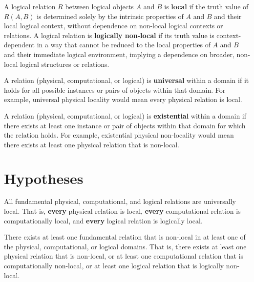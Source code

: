 \begin{definition}
	A logical relation $R$ between logical objects $A$ and $B$ is \textbf{local} if the truth value of $R(A, B)$ is determined solely by the intrinsic properties of $A$ and $B$ and their local logical context, without dependence on non-local logical contexts or relations. A logical relation is \textbf{logically non-local} if its truth value is context-dependent in a way that cannot be reduced to the local properties of $A$ and $B$ and their immediate logical environment, implying a dependence on broader, non-local logical structures or relations.
\end{definition}

\begin{definition}
	A relation (physical, computational, or logical) is \textbf{universal} within a domain if it holds for all possible instances or pairs of objects within that domain. For example, universal physical locality would mean every physical relation is local.
\end{definition}

\begin{definition}
	A relation (physical, computational, or logical) is \textbf{existential} within a domain if there exists at least one instance or pair of objects within that domain for which the relation holds. For example, existential physical non-locality would mean there exists at least one physical relation that is non-local.
\end{definition}

\section{Hypotheses}

\begin{hypothesis}
	All fundamental physical, computational, and logical relations are universally local. That is, \textbf{every} physical relation is local, \textbf{every} computational relation is computationally local, and \textbf{every} logical relation is logically local.
\end{hypothesis}

\begin{hypothesis}
	There exists at least one fundamental relation that is non-local in at least one of the physical, computational, or logical domains. That is, there exists at least one physical relation that is non-local, or at least one computational relation that is computationally non-local, or at least one logical relation that is logically non-local.
\end{hypothesis}

